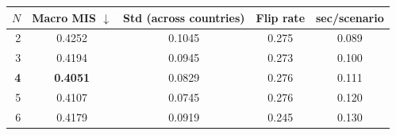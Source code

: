 \begin{tabular}{rcccc}\toprule
$N$ & Macro MIS $\downarrow$ & Std (across countries) & Flip rate & sec/scenario \\\midrule
2 & 0.4252 & 0.1045 & 0.275 & 0.089 \\
3 & 0.4194 & 0.0945 & 0.273 & 0.100 \\
\textbf{4} & \textbf{0.4051} & 0.0829 & 0.276 & 0.111 \\
5 & 0.4107 & 0.0745 & 0.276 & 0.120 \\
6 & 0.4179 & 0.0919 & 0.245 & 0.130 \\
\bottomrule
\end{tabular}